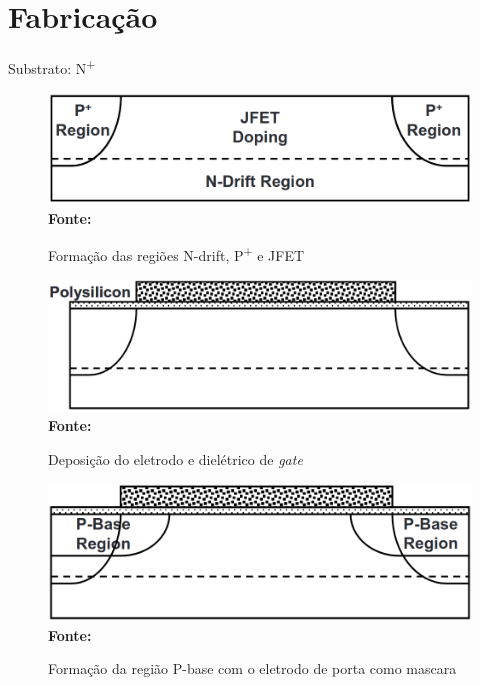 \section{Fabricação}

\begin{frame}

    Substrato: N\textsuperscript{+}

    \begin{figure}[!htbp]
        \centering
        \caption{Formação das regiões N-drift, P\textsuperscript{+} e JFET}
        \includegraphics[scale=0.2]{imagens/dmos_fab_a.png}
        \\\small{\textbf{Fonte:} \cite{baliga2010fundamentals}}%
    \end{figure}

\end{frame}

\begin{frame}

    \begin{figure}[!htbp]
        \centering
        \caption{Deposição do eletrodo e dielétrico de \textit{gate}}
        \includegraphics[scale=0.2]{imagens/dmos_fab_b.png}
        \\\small{\textbf{Fonte:} \cite{baliga2010fundamentals}}%
    \end{figure}

\end{frame}

\begin{frame}

    \begin{figure}[!htbp]
        \centering
        \caption{Formação da região P-base com o eletrodo de porta como mascara}
        \includegraphics[scale=0.2]{imagens/dmos_fab_c.png}
        \\\small{\textbf{Fonte:} \cite{baliga2010fundamentals}}%
    \end{figure}

\end{frame}

